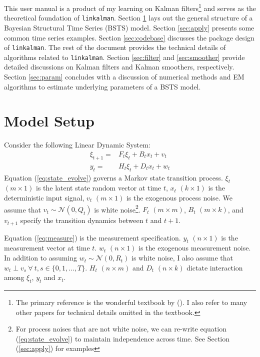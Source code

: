 \documentclass[10pt, titlepage]{article}
\numberwithin{equation}{section}
\begin{document}
This user manual is a product of my learning on Kalman filters\footnote{The primary reference is the wonderful textbook by (\cite{durbin_koopman_2001}). I also refer to many other papers for technical details omitted in the textbook.} and serves as the theoretical foundation of \texttt{linkalman}. Section \ref{sec:model_setup} lays out the general structure of a Bayesian Structural Time Series (BSTS) model. Section \ref{sec:apply} presents some common time series examples. Section \ref{sec:codebase} discusses the package design of \texttt{linkalman}. The rest of the document provides the technical details of algorithms related to \texttt{linkalman}. Section \ref{sec:filter} and \ref{sec:smoother} provide detailed discussions on Kalman filters and Kalman smoothers, respectively. Section \ref{sec:param} concludes with a discussion of numerical methods and EM algorithms to estimate underlying parameters of a BSTS model. 

\section{Model Setup} \label{sec:model_setup}
Consider the following Linear Dynamic System:
\begin{align}
    \xi_{t+1} = & F_{t}\xi_{t} + B_{t}x_t + v_t \label{eq:state_evolve} \\
    y_t = & H_t\xi_{t} + D_{t}x_t + w_t \label{eq:measure}
\end{align}
Equation (\ref{eq:state_evolve}) governs a Markov state transition process. $\xi_t$ $(m\times 1)$ is the latent state random vector at time $t$, $x_t$ $(k\times 1)$ is the deterministic input signal, $v_t$ $(m\times 1)$ is the exogenous process noise. We assume that $v_t\sim \mathcal{N}(0,Q_t)$ is white noise\footnote{For process noises that are not white noise, we can re-write equation (\ref{eq:state_evolve}) to maintain independence across time. See Section (\ref{sec:apply}) for examples}. $F_t$ $(m\times m)$, $B_t$ $(m\times k)$, and $v_{t+1}$ specify the transition dynamics between $t$ and $t+1$. 

Equation (\ref{eq:measure}) is the measurement specification. $y_t$ $(n\times 1)$ is the measurement vector at time $t$. $w_t$ $(n\times 1)$ is the exogenous measurement noise. In addition to assuming $w_t\sim \mathcal{N}(0, R_t)$ is white noise, I also assume that  $w_t \perp v_s \ \forall\  t,s\in\{0,1,...,T\}$. $H_t$ $(n\times m)$ and $D_t$ $(n\times k)$ dictate interaction among $\xi_t$, $y_t$ and $x_t$. 
\end{document}
